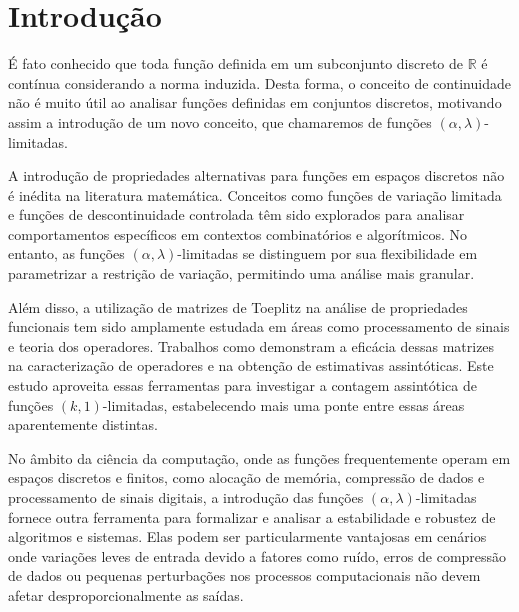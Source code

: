 \section*{Introdução}

% 

\vspace{1cm}
\normalsize

É fato conhecido que toda função definida em um subconjunto discreto de $\mathbb{R}$ é contínua considerando a norma induzida. Desta forma, o conceito de continuidade não é muito útil ao analisar funções definidas em conjuntos discretos, motivando assim a introdução de um novo conceito, que chamaremos de funções $(\alpha,\lambda)$-limitadas.

A introdução de propriedades alternativas para funções em espaços discretos não é inédita na literatura matemática. Conceitos como funções de variação limitada e funções de descontinuidade controlada têm sido explorados para analisar comportamentos específicos em contextos combinatórios e algorítmicos. No entanto, as funções $(\alpha,\lambda)$-limitadas se distinguem por sua flexibilidade em parametrizar a restrição de variação, permitindo uma análise mais granular.

Além disso, a utilização de matrizes de Toeplitz na análise de propriedades funcionais tem sido amplamente estudada em áreas como processamento de sinais e teoria dos operadores. Trabalhos como \cite{bottcher} demonstram a eficácia dessas matrizes na caracterização de operadores e na obtenção de estimativas assintóticas. Este estudo aproveita essas ferramentas para investigar a contagem assintótica de funções $(k,1)$-limitadas, estabelecendo mais uma ponte entre essas áreas aparentemente distintas.

No âmbito da ciência da computação, onde as funções frequentemente operam em espaços discretos e finitos, como alocação de memória, compressão de dados e processamento de sinais digitais, a introdução das funções $(\alpha,\lambda)$-limitadas fornece outra ferramenta para formalizar e analisar a estabilidade e robustez de algoritmos e sistemas. Elas podem ser particularmente vantajosas em cenários onde variações leves de entrada devido a fatores como ruído, erros de compressão de dados ou pequenas perturbações nos processos computacionais não devem afetar desproporcionalmente as saídas.

